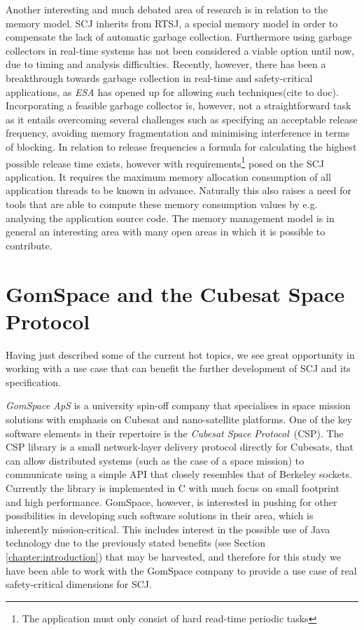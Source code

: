 Another interesting and much debated area of research is in relation to the memory model. SCJ inherits from RTSJ, a special memory model in order to compensate the lack of automatic garbage collection. Furthermore using garbage collectors in real-time systems has not been considered a viable option until now, due to timing and analysis difficulties. Recently, however, there has been a breakthrough towards garbage collection in real-time and safety-critical applications, as \textit{ESA} has opened up for allowing such techniques(cite to doc). Incorporating a feasible garbage collector is, however, not a straightforward task as it entails overcoming several challenges such as specifying an acceptable release frequency, avoiding memory fragmentation and minimising interference in terms of blocking. In relation to release frequencies a formula for calculating the highest possible release time exists, however with requirements\footnote{The application must only consist of hard read-time periodic tasks} posed on the SCJ application. It requires the maximum memory allocation consumption of all application threads to be known in advance\cite{Schoeberl:2007:GCS:1288940.1288953}. Naturally this also raises a need for tools that are able to compute these memory consumption values by e.g. analysing the application source code. The memory management model is in general an interesting area with many open areas in which it is possible to contribute.

\section{GomSpace and the Cubesat Space Protocol} %
\label{sec:gomspace_and_the_cubesat_space_protocol}
Having just described some of the current hot topics, we see great opportunity in working with a use case that can benefit the further development of SCJ and its specification.

\textit{GomSpace ApS} is a university spin-off company that specialises in space mission solutions with emphasis on Cubesat and nano-satellite platforms\cite{GomSpace}. One of the key software elements in their repertoire is the \textit{Cubesat Space Protocol}~(CSP). The CSP library is a small network-layer delivery protocol directly for Cubesats, that can allow distributed systems (such as the case of a space mission) to communicate using a simple API that closely resembles that of Berkeley sockets. Currently the library is implemented in C with much focus on small footprint and high performance. GomSpace, however, is interested in pushing for other possibilities in developing such software solutions in their area, which is inherently mission-critical. This includes interest in the possible use of Java technology due to the previously stated benefits (see Section \ref{chapter:introduction}) that may be harvested, and therefore for this study we have been able to work with the GomSpace company to provide a use case of real safety-critical dimensions for SCJ.

